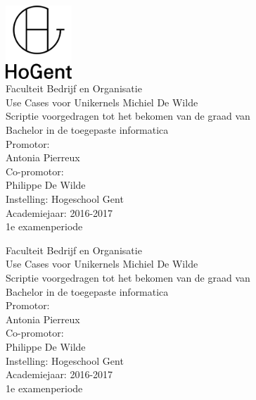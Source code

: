 \documentclass[pdftex,a4paper,12pt,twoside]{report}
\newcommand{\emptypage}{
\newpage
\thispagestyle{empty}
\mbox{}
\newpage
}
\newcommand{\student}{Michiel De Wilde}
\newcommand{\promotor}{Antonia Pierreux}
\newcommand{\copromotor}{Philippe De Wilde}
\newcommand{\instelling}{Hogeschool Gent}
\newcommand{\titel}{Use Cases voor Unikernels}
\newcommand{\faculteit}{Faculteit Bedrijf en Organisatie}
\newcommand{\rapporttype}{Scriptie voorgedragen tot het bekomen van de graad van\\Bachelor in de toegepaste informatica}
\newcommand{\academiejaar}{2016-2017}
\newcommand{\examenperiode}{1e examenperiode}
\begin{document}

\begin{titlepage}
  \begin{center}

    \begingroup
    \rmfamily
    \includegraphics[width=2.5cm]{img/HG-beeldmerk-woordmerk}\\[.5cm]
    \faculteit\\[3cm]
    \titel
    \vfill
    \student\\[3.5cm]
    \rapporttype\\[2cm]
    Promotor:\\
    \promotor\\
    Co-promotor:\\
    \copromotor\\[2.5cm]
    Instelling: \instelling\\[.5cm]
    Academiejaar: \academiejaar\\[.5cm]
    \examenperiode
    \endgroup

  \end{center}
  \restoregeometry
\end{titlepage}


\emptypage


\begin{titlepage}
  \begin{center}

    \begingroup
    \rmfamily
    \faculteit\\[3cm]
    \titel
    \vfill
    \student\\[3.5cm]
    \rapporttype\\[2cm]
    Promotor:\\
    \promotor\\
    Co-promotor:\\
    \copromotor\\[2.5cm]
    Instelling: \instelling\\[.5cm]
    Academiejaar: \academiejaar\\[.5cm]
    \examenperiode
    \endgroup

  \end{center}
  \restoregeometry
\end{titlepage}
\end{document}
